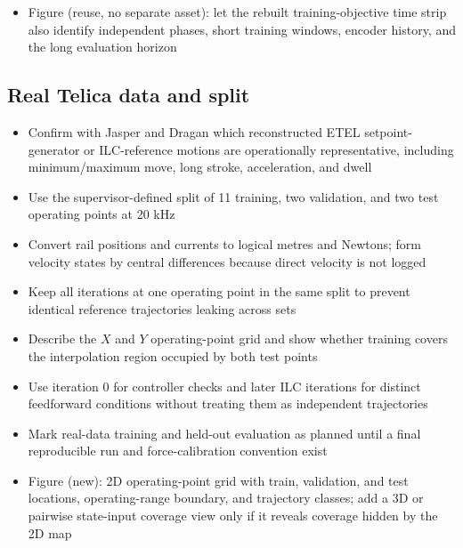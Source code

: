 \begin{wip}
\begin{itemize}
\item Figure (reuse, no separate asset): let the rebuilt training-objective time strip also identify independent phases, short training windows, encoder history, and the long evaluation horizon
\end{itemize}

\subsection{Real Telica data and split}
\begin{itemize}
\item Confirm with Jasper and Dragan which reconstructed ETEL setpoint-generator or ILC-reference motions are operationally representative, including minimum/maximum move, long stroke, acceleration, and dwell
\item Use the supervisor-defined split of 11 training, two validation, and two test operating points at 20 kHz
\item Convert rail positions and currents to logical metres and Newtons; form velocity states by central differences because direct velocity is not logged
\item Keep all iterations at one operating point in the same split to prevent identical reference trajectories leaking across sets
\item Describe the $X$ and $Y$ operating-point grid and show whether training covers the interpolation region occupied by both test points
\item Use iteration 0 for controller checks and later ILC iterations for distinct feedforward conditions without treating them as independent trajectories
\item Mark real-data training and held-out evaluation as planned until a final reproducible run and force-calibration convention exist
\item Figure (new): 2D operating-point grid with train, validation, and test locations, operating-range boundary, and trajectory classes; add a 3D or pairwise state-input coverage view only if it reveals coverage hidden by the 2D map
\end{itemize}


\end{wip}
